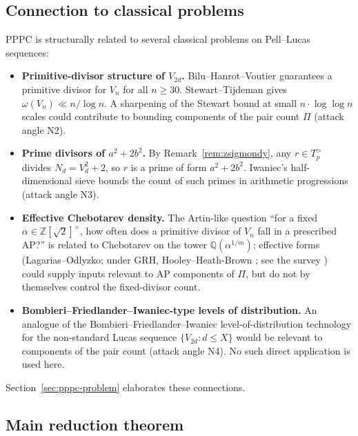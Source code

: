 \documentclass[11pt]{amsart}
\theoremstyle{plain}
\theoremstyle{definition}
\theoremstyle{remark}
\numberwithin{equation}{section}
\newcommand{\Z}{\mathbb{Z}}
\newcommand{\Q}{\mathbb{Q}}
\begin{document}
\subsection{Connection to classical problems}

PPPC is structurally related to several classical problems on Pell--Lucas sequences:

\begin{itemize}
\item \textbf{Primitive-divisor structure of $V_{2 d}$.} Bilu--Hanrot--Voutier \cite{ref:BHV} guarantees a primitive divisor for $V_n$ for all $n \geq 30$. Stewart--Tijdeman \cite{ref:Stewart} gives $\omega(V_n) \ll n / \log n$. A sharpening of the Stewart bound at small $n \cdot \log \log n$ scales could contribute to bounding components of the pair count $\Pi$ (attack angle N2).

\item \textbf{Prime divisors of $a^2 + 2 b^2$.} By Remark~\ref{rem:zsigmondy}, any $r \in T_p^{>}$ divides $N_d = V_d^2 + 2$, so $r$ is a prime of form $a^2 + 2 b^2$. Iwaniec's half-dimensional sieve \cite{ref:Iwaniec} bounds the count of such primes in arithmetic progressions (attack angle N3).

\item \textbf{Effective Chebotarev density.} The Artin-like question ``for a fixed $\alpha \in \Z[\sqrt 2]^\times$, how often does a primitive divisor of $V_n$ fall in a prescribed AP?'' is related to Chebotarev on the tower $\Q(\alpha^{1/m})$; effective forms (Lagarias--Odlyzko; under GRH, Hooley--Heath-Brown \cite{ref:Hooley, ref:HeathBrown}; see the survey \cite{ref:Moree}) could supply inputs relevant to AP components of $\Pi$, but do not by themselves control the fixed-divisor count.

\item \textbf{Bombieri--Friedlander--Iwaniec-type levels of distribution.} An analogue of the Bombieri--Friedlander--Iwaniec level-of-distribution technology for the non-standard Lucas sequence $\{V_{2 d} : d \leq X\}$ would be relevant to components of the pair count (attack angle N4). No such direct application is used here.
\end{itemize}

Section~\ref{sec:pppc-problem} elaborates these connections.

\subsection{Main reduction theorem}\label{sec:main-reduction}
\end{document}

